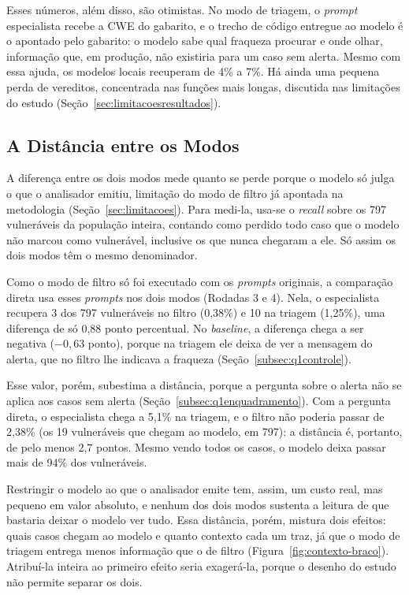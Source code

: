 Esses números, além disso, são otimistas. No modo de triagem, o \textit{prompt} especialista recebe a CWE do gabarito, e o trecho de código entregue ao modelo é o apontado pelo gabarito: o modelo sabe qual fraqueza procurar e onde olhar, informação que, em produção, não existiria para um caso sem alerta. Mesmo com essa ajuda, os modelos locais recuperam de 4\% a 7\%. Há ainda uma pequena perda de vereditos, concentrada nas funções mais longas, discutida nas limitações do estudo (Seção~\ref{sec:limitacoesresultados}).

\subsection{A Distância entre os Modos}
\label{subsec:q2distancia}

A diferença entre os dois modos mede quanto se perde porque o modelo só julga o que o analisador emitiu, limitação do modo de filtro já apontada na metodologia (Seção~\ref{sec:limitacoes}). Para medi-la, usa-se o \textit{recall} sobre os 797 vulneráveis da população inteira, contando como perdido todo caso que o modelo não marcou como vulnerável, inclusive os que nunca chegaram a ele. Só assim os dois modos têm o mesmo denominador.

Como o modo de filtro só foi executado com os \textit{prompts} originais, a comparação direta usa esses \textit{prompts} nos dois modos (Rodadas 3 e 4). Nela, o especialista recupera 3 dos 797 vulneráveis no filtro (0,38\%) e 10 na triagem (1,25\%), uma diferença de só 0,88 ponto percentual. No \textit{baseline}, a diferença chega a ser negativa ($-0{,}63$ ponto), porque na triagem ele deixa de ver a mensagem do alerta, que no filtro lhe indicava a fraqueza (Seção~\ref{subsec:q1controle}).

Esse valor, porém, subestima a distância, porque a pergunta sobre o alerta não se aplica aos casos sem alerta (Seção~\ref{subsec:q1enquadramento}). Com a pergunta direta, o especialista chega a 5,1\% na triagem, e o filtro não poderia passar de 2,38\% (os 19 vulneráveis que chegam ao modelo, em 797): a distância é, portanto, de pelo menos 2,7 pontos. Mesmo vendo todos os casos, o modelo deixa passar mais de 94\% dos vulneráveis.

Restringir o modelo ao que o analisador emite tem, assim, um custo real, mas pequeno em valor absoluto, e nenhum dos dois modos sustenta a leitura de que bastaria deixar o modelo ver tudo. Essa distância, porém, mistura dois efeitos: quais casos chegam ao modelo e quanto contexto cada um traz, já que o modo de triagem entrega menos informação que o de filtro (Figura~\ref{fig:contexto-braco}). Atribuí-la inteira ao primeiro efeito seria exagerá-la, porque o desenho do estudo não permite separar os dois.

